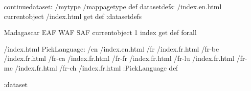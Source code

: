 \begin{ingrid}
continuedataset:
/mytype /mappagetype def
datasetdefs:
/index.en.html currentobject /index.html get def
:datasetdefs

{ Madagascar EAF WAF SAF } { currentobject 1 index get def } forall

/index.html {
PickLanguage:
/en /index.en.html
/fr /index.fr.html
/fr-be /index.fr.html
/fr-ca /index.fr.html
/fr-fr /index.fr.html
/fr-lu /index.fr.html
/fr-mc /index.fr.html
/fr-ch /index.fr.html
:PickLanguage
} def

:dataset
\end{ingrid}
